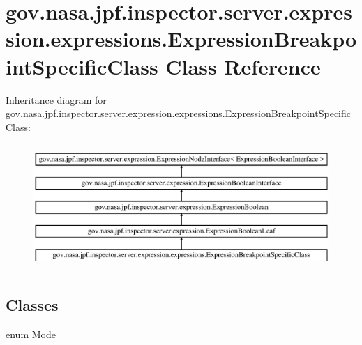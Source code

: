 \hypertarget{classgov_1_1nasa_1_1jpf_1_1inspector_1_1server_1_1expression_1_1expressions_1_1_expression_breakpoint_specific_class}{}\section{gov.\+nasa.\+jpf.\+inspector.\+server.\+expression.\+expressions.\+Expression\+Breakpoint\+Specific\+Class Class Reference}
\label{classgov_1_1nasa_1_1jpf_1_1inspector_1_1server_1_1expression_1_1expressions_1_1_expression_breakpoint_specific_class}
Inheritance diagram for gov.\+nasa.\+jpf.\+inspector.\+server.\+expression.\+expressions.\+Expression\+Breakpoint\+Specific\+Class\+:\begin{figure}[H]
\begin{center}
\leavevmode
\includegraphics[height=4.827586cm]{classgov_1_1nasa_1_1jpf_1_1inspector_1_1server_1_1expression_1_1expressions_1_1_expression_breakpoint_specific_class}
\end{center}
\end{figure}
\subsection*{Classes}
\begin{DoxyCompactItemize}
\item 
enum \hyperlink{enumgov_1_1nasa_1_1jpf_1_1inspector_1_1server_1_1expression_1_1expressions_1_1_expression_breakpoint_specific_class_1_1_mode}{Mode}
\end{DoxyCompactItemize}
